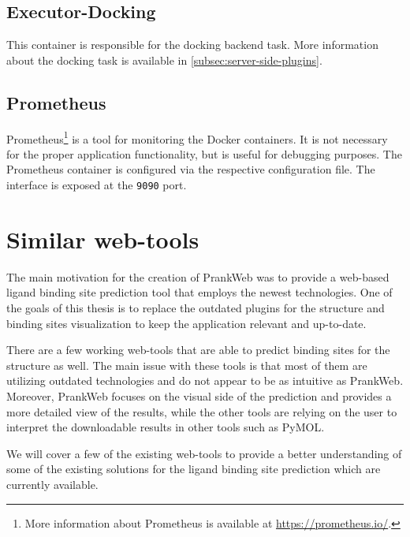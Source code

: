 \subsection{Executor-Docking}
\label{subsec:executor-docking}

This container is responsible for the docking backend task. More information about the docking task is available in \cref{subsec:server-side-plugins}.


\subsection{Prometheus}
\label{subsec:prometheus}

Prometheus\footnote{More information about Prometheus is available at \url{https://prometheus.io/}.} is a tool for monitoring the Docker containers. It is not necessary for the proper application functionality, but is useful for debugging purposes. The Prometheus container is configured via the respective configuration file. The interface is exposed at the \texttt{9090} port.

\section{Similar web-tools}
\label{sec:similar_web_tools}

The main motivation for the creation of PrankWeb was to provide a web-based ligand binding site prediction tool that employs the newest technologies. One of the goals of this thesis is to replace the outdated plugins for the structure and binding sites visualization to keep the application relevant and up-to-date.

There are a few working web-tools that are able to predict binding sites for the structure as well. The main issue with these tools is that most of them are utilizing outdated technologies and do not appear to be as intuitive as PrankWeb\cite{jendele2019prankweb}. Moreover, PrankWeb focuses on the visual side of the prediction and provides a more detailed view of the results, while the other tools are relying on the user to interpret the downloadable results in other tools such as PyMOL.

We will cover a few of the existing web-tools to provide a better understanding of some of the existing solutions for the ligand binding site prediction which are currently available.

